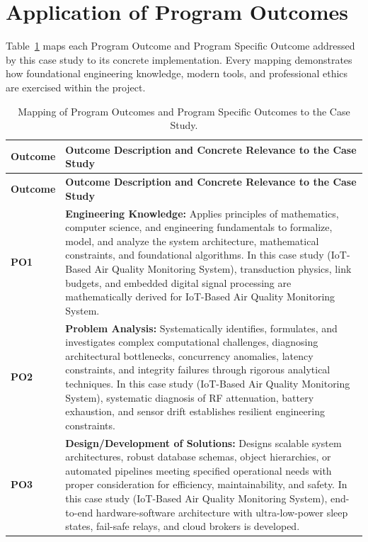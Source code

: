 \section{Application of Program Outcomes}
Table~\ref{tab:po} maps each Program Outcome and Program Specific Outcome addressed by this case study to its concrete implementation. Every mapping demonstrates how foundational engineering knowledge, modern tools, and professional ethics are exercised within the project.

{\small
\begin{longtable}{@{}>{\centering\arraybackslash}p{1.8cm} p{13.2cm}@{}}
    \caption{Mapping of Program Outcomes and Program Specific Outcomes to the Case Study.}\label{tab:po}\\
    \toprule
    \textbf{Outcome} & \textbf{Outcome Description and Concrete Relevance to the Case Study} \\
    \midrule
    \endfirsthead
    \toprule
    \textbf{Outcome} & \textbf{Outcome Description and Concrete Relevance to the Case Study} \\
    \midrule
    \endhead
\textbf{PO1} & \textbf{Engineering Knowledge:} Applies principles of mathematics, computer science, and engineering fundamentals to formalize, model, and analyze the system architecture, mathematical constraints, and foundational algorithms. In this case study (IoT-Based Air Quality Monitoring System), transduction physics, link budgets, and embedded digital signal processing are mathematically derived for IoT-Based Air Quality Monitoring System. \\
    \addlinespace
\textbf{PO2} & \textbf{Problem Analysis:} Systematically identifies, formulates, and investigates complex computational challenges, diagnosing architectural bottlenecks, concurrency anomalies, latency constraints, and integrity failures through rigorous analytical techniques. In this case study (IoT-Based Air Quality Monitoring System), systematic diagnosis of RF attenuation, battery exhaustion, and sensor drift establishes resilient engineering constraints. \\
    \addlinespace
\textbf{PO3} & \textbf{Design/Development of Solutions:} Designs scalable system architectures, robust database schemas, object hierarchies, or automated pipelines meeting specified operational needs with proper consideration for efficiency, maintainability, and safety. In this case study (IoT-Based Air Quality Monitoring System), end-to-end hardware-software architecture with ultra-low-power sleep states, fail-safe relays, and cloud brokers is developed. \\

\end{longtable}}
